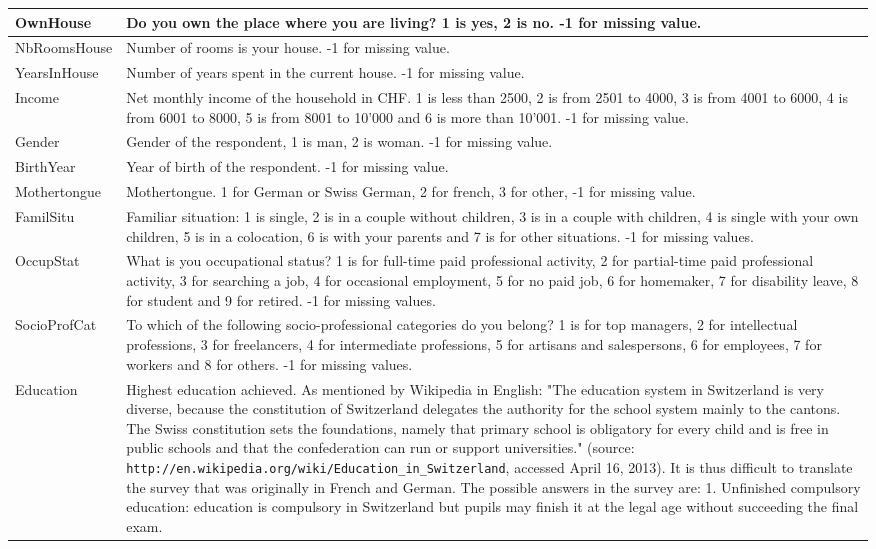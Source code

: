 \documentclass[12pt,a4paper]{article}
\begin{document}
\begin{longtable}{||p{4cm}|p{9cm}||}
\hline 
OwnHouse & Do you own the place where you are living? 1 is yes, 2 is no. -1 for missing value.\tabularnewline
\hline 
NbRoomsHouse & Number of rooms is your house. -1 for missing value.\tabularnewline
\hline 
YearsInHouse & Number of years spent in the current house. -1 for missing value.\tabularnewline
\hline 
Income & Net monthly income of the household in CHF. 1 is less than 2500, 2 is from 2501 to 4000, 3 is from 4001 to 6000, 4 is from 6001 to 8000, 5 is from 8001 to 10'000 and 6 is more than 10'001. -1 for missing value.\tabularnewline
\hline 
Gender & Gender of the respondent, 1 is man, 2 is woman. -1 for missing value.\tabularnewline
\hline 
BirthYear & Year of birth of the respondent. -1 for missing value.\tabularnewline
\hline 
Mothertongue & Mothertongue. 1 for German or Swiss German, 2 for french, 3 for other, -1 for missing value.\tabularnewline
\hline
FamilSitu & Familiar situation: 1 is single, 2 is in a couple without children, 3 is in a couple with children, 4 is single with your own children, 5 is in a colocation, 6 is with your parents and 7 is for other situations. -1 for missing values.\tabularnewline
\hline
OccupStat &What is you occupational status? 1 is for full-time paid
professional activity, 2 for partial-time paid professional activity,
3 for searching a job, 4 for occasional employment, 5 for no paid job,
6 for homemaker, 7 for disability leave, 8 for student and 9 for retired. -1 for missing values. \tabularnewline
\hline
SocioProfCat & To which of the following socio-professional categories do you belong? 1 is for top managers, 2 for intellectual professions, 3 for freelancers, 4 for intermediate professions, 5 for artisans and salespersons, 6 for employees, 7 for workers and 8 for others. -1 for missing values.\tabularnewline
\hline
Education &Highest education achieved. As mentioned by Wikipedia in English: "The education system in Switzerland is very diverse, because the constitution of Switzerland delegates the authority for the school system mainly to the cantons. The Swiss constitution sets the foundations, namely that primary school is obligatory for every child and is free in public schools and that the confederation can run or support universities." (source: \lstinline|http://en.wikipedia.org/wiki/Education_in_Switzerland|, accessed April 16, 2013). It is thus difficult to translate the survey that was originally in French and German. The possible answers in the survey are:
1. Unfinished compulsory education: education is compulsory in Switzerland but pupils may finish it at the legal age without succeeding the final exam.

\end{longtable}
\end{document}
